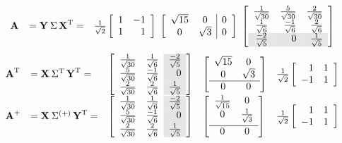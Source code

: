\begin{equation*}
  \begin{array}{lllll}
     \svda{T} = &  \stwo
  \mat{rr}{1 & -1\\1 & 1}
  \ 
  \mat{cc|c}
  {\sqrt{15} & 0 & 0 \\
  0 & \sqrt{3}  & 0}
  \ 
  \mat{ crr }
 {\frac{1}{\sqrt{30}} & \frac{5}{\sqrt{30}} & \frac{2}{\sqrt{30}}\\
  \ssix & \frac{-1}{\sqrt{6}} & \frac{2}{\sqrt{6}} \\
  \rowcolor{ltgray}
  \frac{-2}{\sqrt{5}} & 0 & \sfive}\\
  \end{array}
\end{equation*}
\begin{equation*}
  \begin{array}{lllll}
     \A{T} &= \svdt{T} = &
     \mat{rr>{\columncolor{ltgray}}r}
     { \frac{1}{\sqrt{30}} & \ssix               & \frac{-2}{\sqrt{5}} \\
       \frac{5}{\sqrt{30}} & \frac{-1}{\sqrt{6}} & 0 \\
       \frac{2}{\sqrt{30}} & \frac{2}{\sqrt{6}}  & \frac{1}{\sqrt{5}} }
     & \mat{cc}{\sqrt{15}&0\\0&\sqrt{3}\\\hline0&0} & \stwo \mat{rr}{1&1\\-1&1}\\[5pt]
     \mpgia{T} = &
     \mat{rr>{\columncolor{ltgray}}r}
     { \frac{1}{\sqrt{30}} & \ssix            & \frac{-2}{\sqrt{5}} \\
       \frac{5}{\sqrt{30}} & \frac{-1}{\sqrt{6}} & 0 \\
       \frac{2}{\sqrt{30}} & \frac{2}{\sqrt{6}}  & \frac{1}{\sqrt{5}} }
     & \mat{cc}{\frac{1}{\sqrt{15}}&0\\0&\frac{1}{\sqrt{3}}\\[5pt]\hline0&0}
     & \stwo \mat{rr}{1&1\\-1&1}
  \end{array}
\end{equation*}

